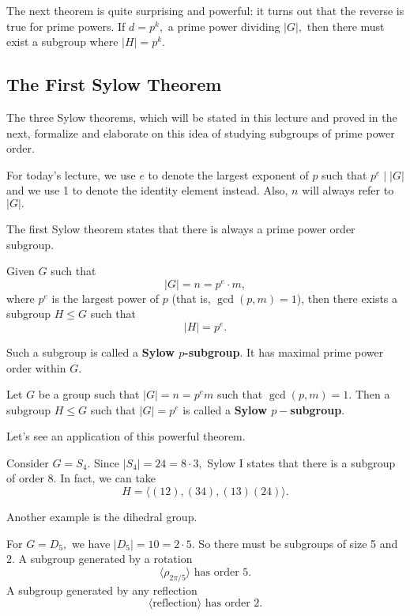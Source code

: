The next theorem is quite surprising and powerful: it turns out that the reverse is true for prime powers. If $d = p^k,$ a prime power dividing $|G|,$ then there must exist a subgroup where $|H| = p^k.$

\subsection{The First Sylow Theorem}

The three Sylow theorems, which will be stated in this lecture and proved in the next, formalize and elaborate on this idea of studying subgroups of prime power order. 

\begin{note}
For today's lecture, we use $e$ to denote the largest exponent of $p$ such that $p^e \mid |G|$ and we use 1 to denote the identity element instead. Also, $n$ will always refer to $|G|.$
\end{note}

The first Sylow theorem states that there is always a prime power order subgroup. 
\begin{theorem}[Sylow I]

Given $G$ such that \[|G| = n = p^e \cdot m,\] where $p^e$ is the largest power of $p$ (that is, $\gcd(p, m) = 1$), then there exists a subgroup $H \leq G$ such that \[|H| = p^e.\]
\end{theorem} 

Such a subgroup is called a \textbf{Sylow $p$-subgroup}. It has maximal prime power order within $G.$

\begin{definition}
Let $G$ be a group such that $|G| = n = p^e m$ such that $\gcd(p, m) = 1.$ Then a subgroup $H \leq G$ such that $|G| = p^e$ is called a \textbf{Sylow $p-$subgroup}.
\end{definition}

Let's see an application of this powerful theorem. 

\begin{example}
Consider $G = S_4.$ Since $|S_4| = 24 = 8 \cdot 3,$ Sylow I states that there is a subgroup of order 8. In fact, we can take \[H = \langle (12), (34), (13)(24) \rangle.\] 
\end{example}

Another example is the dihedral group. 

\begin{example}
For $G = D_5,$ we have $|D_5| = 10 = 2 \cdot 5.$ So there must be subgroups of size 5 and 2. A subgroup generated by a rotation
\[\langle \rho_{2\pi / 5} \rangle \text{ has order 5.}\] A subgroup generated by any reflection \[ \langle \text{reflection} \rangle \text{ has order 2.}\]
\end{example}

